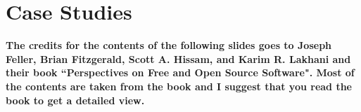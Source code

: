 \documentclass{beamer}
\begin{document}
%

\section{Case Studies}
\begin{frame}
\textbf{The credits for the contents of the following slides goes to Joseph Feller, Brian Fitzgerald, Scott A. Hissam, and Karim R. Lakhani and their book ``Perspectives on Free and Open Source Software". Most of the contents are taken from the book and I suggest that you read the book to get a detailed view.}
\end{frame}
\end{document}
